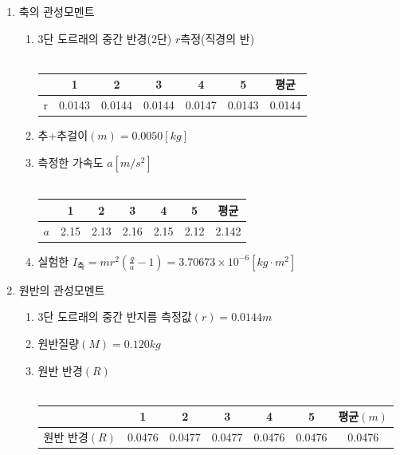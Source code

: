 \documentclass[12pt,a4paper]{article}
\begin{document}
\begin{enumerate}
    \item 축의 관성모멘트
        \begin{enumerate}
            \item 3단 도르래의 중간 반경(2단) $r$측정(직경의 반) \\
                \\
                \begin{tabular}{|c|c|c|c|c|c|c|}
                    \hline
                    &1&2&3&4&5&평균 \\
                    \hline
                    r&0.0143&0.0144&0.0144&0.0147&0.0143&0.0144 \\
                    \hline
                \end{tabular}
            \item 추+추걸이$(m)=0.0050[kg]$
            \item 측정한 가속도 $a[m/s^2]$ \\
                \\
                \begin{tabular}{|c|c|c|c|c|c|c|}
                    \hline
                    &1&2&3&4&5&평균 \\
                    \hline
                    $a$&2.15&2.13&2.16&2.15&2.12&2.142 \\
                    \hline
                \end{tabular}
            \item 실험한 $I_{\textrm{축}}=mr^2(\frac{g}{a}-1)=
            3.70673\times10^{-6}[kg\cdot m^2]$
        \end{enumerate}
    \item 원반의 관성모멘트
        \begin{enumerate}
            \item 3단 도르래의 중간 반지름 측정값$(r)=0.0144m$
            \item 원반질량$(M)=0.120kg$
            \item 원반 반경$(R)$ \\
                \\
                \begin{tabular}{|c|c|c|c|c|c|c|}
                    \hline
                    &1&2&3&4&5&평균$(m)$ \\
                    \hline
                    원반 반경$(R)$&0.0476&0.0477&0.0477&0.0476&0.0476&0.0476 \\
                    \hline
                \end{tabular}

\end{enumerate}
\end{enumerate}
\end{document}
